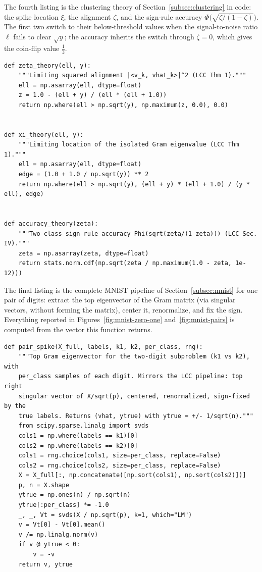 The fourth listing is the clustering theory of Section~\ref{subsec:clustering} in code: the spike location \(\xi\), the alignment \(\zeta\), and the sign-rule accuracy \(\Phi\bigl(\sqrt{\zeta/(1-\zeta)}\bigr)\). The first two switch to their below-threshold values when the signal-to-noise ratio \(\ell\) fails to clear \(\sqrt{y}\); the accuracy inherits the switch through \(\zeta = 0\), which gives the coin-flip value \(\tfrac12\).

\begin{lstlisting}[caption={The three clustering formulas of Section~\ref{subsec:clustering} (from \texttt{05\_clustering\_demos.py}).}, label={lst:clustering-theory}]
def zeta_theory(ell, y):
    """Limiting squared alignment |<v_k, vhat_k>|^2 (LCC Thm 1)."""
    ell = np.asarray(ell, dtype=float)
    z = 1.0 - (ell + y) / (ell * (ell + 1.0))
    return np.where(ell > np.sqrt(y), np.maximum(z, 0.0), 0.0)


def xi_theory(ell, y):
    """Limiting location of the isolated Gram eigenvalue (LCC Thm 1)."""
    ell = np.asarray(ell, dtype=float)
    edge = (1.0 + 1.0 / np.sqrt(y)) ** 2
    return np.where(ell > np.sqrt(y), (ell + y) * (ell + 1.0) / (y * ell), edge)


def accuracy_theory(zeta):
    """Two-class sign-rule accuracy Phi(sqrt(zeta/(1-zeta))) (LCC Sec. IV)."""
    zeta = np.asarray(zeta, dtype=float)
    return stats.norm.cdf(np.sqrt(zeta / np.maximum(1.0 - zeta, 1e-12)))
\end{lstlisting}

The final listing is the complete MNIST pipeline of Section~\ref{subsec:mnist} for one pair of digits: extract the top eigenvector of the Gram matrix (via singular vectors, without forming the matrix), center it, renormalize, and fix the sign. Everything reported in Figures~\ref{fig:mnist-zero-one} and~\ref{fig:mnist-pairs} is computed from the vector this function returns.

\begin{lstlisting}[caption={The two-digit MNIST pipeline (from \texttt{05\_clustering\_demos.py}; drives Section~\ref{subsec:mnist}).}, label={lst:mnist-pipeline}]
def pair_spike(X_full, labels, k1, k2, per_class, rng):
    """Top Gram eigenvector for the two-digit subproblem (k1 vs k2), with
    per_class samples of each digit. Mirrors the LCC pipeline: top right
    singular vector of X/sqrt(p), centered, renormalized, sign-fixed by the
    true labels. Returns (vhat, ytrue) with ytrue = +/- 1/sqrt(n)."""
    from scipy.sparse.linalg import svds
    cols1 = np.where(labels == k1)[0]
    cols2 = np.where(labels == k2)[0]
    cols1 = rng.choice(cols1, size=per_class, replace=False)
    cols2 = rng.choice(cols2, size=per_class, replace=False)
    X = X_full[:, np.concatenate([np.sort(cols1), np.sort(cols2)])]
    p, n = X.shape
    ytrue = np.ones(n) / np.sqrt(n)
    ytrue[:per_class] *= -1.0
    _, _, Vt = svds(X / np.sqrt(p), k=1, which="LM")
    v = Vt[0] - Vt[0].mean()
    v /= np.linalg.norm(v)
    if v @ ytrue < 0:
        v = -v
    return v, ytrue
\end{lstlisting}

\clearpage
